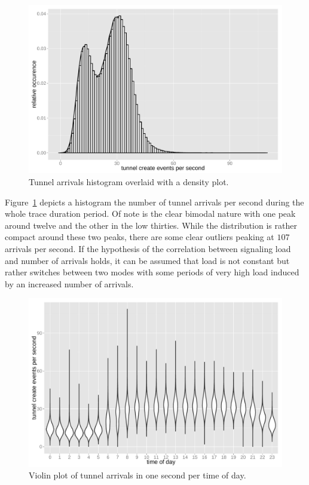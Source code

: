 \begin{figure}[htb]
	\centering
	\includegraphics[width=1.0\textwidth]{images/R-create-frequency.pdf}
	\caption{Tunnel arrivals histogram overlaid with a density plot.}
\label{c4:fig:freq-arrivals}
\end{figure}

Figure~\ref{c4:fig:freq-arrivals} depicts a histogram the number of tunnel arrivals per second during the whole trace duration period. Of note is the clear bimodal nature with one peak around twelve and the other in the low thirties. While the distribution is rather compact around these two peaks, there are some clear outliers peaking at $107$ arrivals per second. If the hypothesis of the correlation between signaling load and number of arrivals holds, it can be assumed that load is not constant but rather switches between two modes with some periods of very high load induced by an increased number of arrivals.

\begin{figure}[htb]
	\centering
	\includegraphics[width=1.0\textwidth]{images/R-createspersecond-1h-violin.pdf}
	\caption{Violin plot of tunnel arrivals in one second per time of day.}
\label{c4:fig:freq-arrivals-per-second-violin}
\end{figure}

